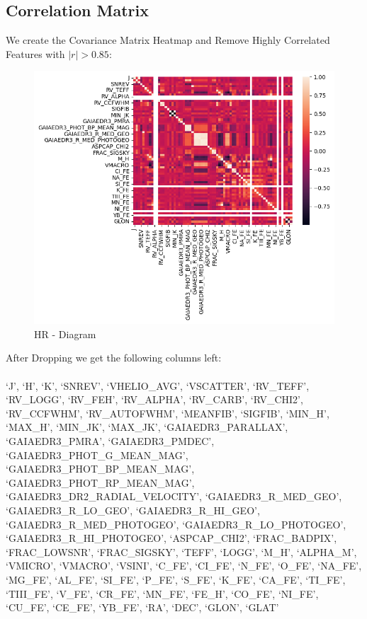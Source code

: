 \documentclass{article}
\begin{document}
\subsection{Correlation Matrix}
We create the Covariance Matrix Heatmap and Remove Highly Correlated Features with \( | r |  > 0.85 \):\\

\begin{figure}[H]
    \centering
    \label{fig:6}
    \includegraphics[width=\textwidth]{Images/CorrelationMatrixBetweenNumerical1.png}
    \caption{HR - Diagram}
\end{figure}


After Dropping we get the following columns left:
\paragraph{}
`J', `H', `K',
`SNREV', `VHELIO\_AVG', `VSCATTER', `RV\_TEFF', `RV\_LOGG', `RV\_FEH', `RV\_ALPHA', `RV\_CARB', `RV\_CHI2', `RV\_CCFWHM', `RV\_AUTOFWHM', `MEANFIB', `SIGFIB', `MIN\_H', `MAX\_H', `MIN\_JK', `MAX\_JK', `GAIAEDR3\_PARALLAX', `GAIAEDR3\_PMRA', `GAIAEDR3\_PMDEC', `GAIAEDR3\_PHOT\_G\_MEAN\_MAG', `GAIAEDR3\_PHOT\_BP\_MEAN\_MAG', `GAIAEDR3\_PHOT\_RP\_MEAN\_MAG', `GAIAEDR3\_DR2\_RADIAL\_VELOCITY', `GAIAEDR3\_R\_MED\_GEO', `GAIAEDR3\_R\_LO\_GEO', `GAIAEDR3\_R\_HI\_GEO', `GAIAEDR3\_R\_MED\_PHOTOGEO', `GAIAEDR3\_R\_LO\_PHOTOGEO', `GAIAEDR3\_R\_HI\_PHOTOGEO', `ASPCAP\_CHI2', `FRAC\_BADPIX', `FRAC\_LOWSNR', `FRAC\_SIGSKY', `TEFF', `LOGG', `M\_H', `ALPHA\_M', `VMICRO', `VMACRO', `VSINI', `C\_FE', `CI\_FE', `N\_FE', `O\_FE', `NA\_FE', `MG\_FE', `AL\_FE', `SI\_FE', `P\_FE', `S\_FE', `K\_FE', `CA\_FE', `TI\_FE', `TIII\_FE', `V\_FE', `CR\_FE', `MN\_FE', `FE\_H', `CO\_FE', `NI\_FE', `CU\_FE', `CE\_FE', `YB\_FE', `RA', `DEC', `GLON', `GLAT'
\end{document}
